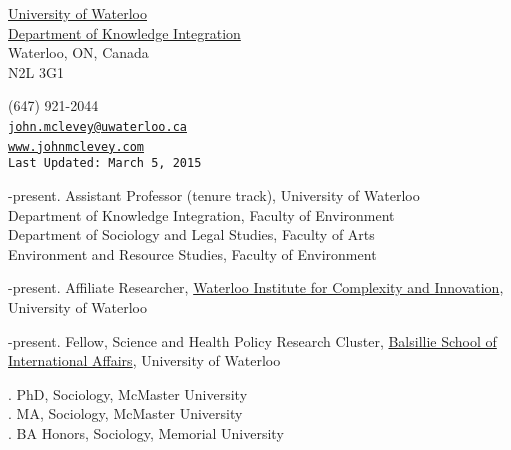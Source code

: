 \documentclass[9pt,usenames,dvipsnames]{article}
\makeatletter
\def\myemail{john.mclevey@uwaterloo.ca}
\def\myweb{www.johnmclevey.com}
\def\myphone{(647) 921-2044}
\def\lastupdated{Last Updated: March 5, 2015}
\makeatother
\begin{document}
\begin{minipage}[t]{2.95in}
 \flushright \footnotesize \href{https://uwaterloo.ca/}{University of Waterloo} \\  \href{https://uwaterloo.ca/knowledge-integration/faculty-mclevey}{Department of Knowledge Integration} \\ Waterloo, ON, Canada \\ N2L 3G1\\
  \end{minipage}
\hfill     
\hfill
\begin{minipage}[t]{1.7in}
  \flushright \footnotesize \myphone\, \faPhone \\
  {\texttt{\href{mailto:\myemail}{\myemail}} \, \faEnvelope} \\
  {\texttt{\href{\myweb}{\myweb}} \, \faGlobe} \\
  {\texttt{\lastupdated}}\\
\end{minipage}


\bigskip

\reversemarginpar

\bigskip 
{}
\smallskip 
{}-present. Assistant Professor (tenure track), University of Waterloo \\
\noindent Department of Knowledge Integration, Faculty of Environment \\
\noindent Department of Sociology and Legal Studies, Faculty of Arts \\
\noindent Environment and Resource Studies, Faculty of Environment \\
\smallskip


-present. Affiliate Researcher, \href{http://wici.ca/new/}{Waterloo Institute for Complexity and Innovation}, University of Waterloo 

-present. Fellow, Science and Health Policy Research Cluster, \href{http://www.balsillieschool.ca/}{Balsillie School of International Affairs}, University of Waterloo \\

\medskip 
{}

. PhD, Sociology, McMaster University \\
. MA, Sociology, McMaster University \\
. BA Honors, Sociology, Memorial University \\
\end{document}
